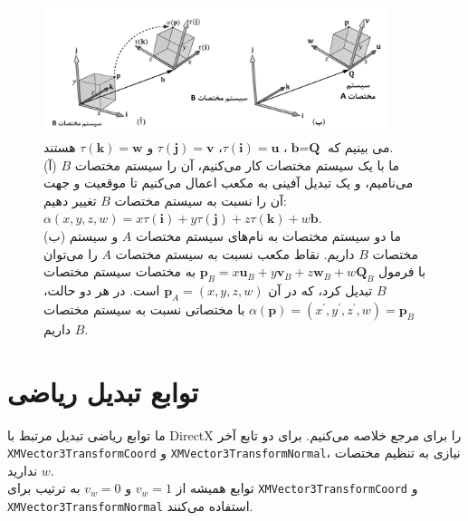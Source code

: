 {\begin{spacing}{1.5}
        \begin{figure}[H]
            \centering
            \setlength{\belowcaptionskip}{-10pt}
            \includegraphics[width=0.9\textwidth]{Images/4/3/4.Session.1.3.15}
            \caption {می بینیم که $\textbf{b}=\textbf{Q}$، $\tau(\textbf{i})=\textbf{u}$، $\tau(\textbf{j})=\textbf{v}$ و $\tau(\textbf{k})=\textbf{w}$ هستند.
            \\(آ) ما با یک سیستم مختصات کار می‌کنیم، آن را سیستم مختصات $B$ می‌نامیم، و یک تبدیل آفینی به مکعب اعمال می‌کنیم
            تا موقعیت و جهت آن را نسبت به سیستم مختصات $B$ تغییر دهیم: $\alpha(x,y,z,w)=x\tau(\textbf{i})+y\tau(\textbf{j})+z\tau(\textbf{k})+w\textbf{b}$.
            \\(ب) ما دو سیستم مختصات به نام‌های سیستم مختصات $A$ و سیستم مختصات $B$ داریم.
            نقاط مکعب نسبت به سیستم مختصات $A$ را می‌توان با فرمول $\textbf{p}_{B}=x\textbf{u}_{B}+y\textbf{v}_{B}+z\textbf{w}_{B}+w\textbf{Q}_{B}$ به مختصات سیستم مختصات $B$ تبدیل کرد، که در آن $\textbf{p}_{A}=(x,y,z,w)$ است.
            در هر دو حالت، $\alpha(\textbf{p})=(x^\prime,y^\prime,z^\prime,w)=\textbf{p}_{B}$ با مختصاتی نسبت به سیستم مختصات $B$ داریم.}
            \label{fig:4.Session.1.3.15}
        \end{figure}
    \end{spacing}
}


\section{\textbf{توابع تبدیل ریاضی }}
\label{sec:3.6}
{
    \Large
    \begin{spacing}{1.5}
        ما توابع ریاضی تبدیل مرتبط با DirectX را برای مرجع خلاصه می‌کنیم.
        \textbf{\vspace{6pt}}
        \lr{}
        \textbf{\vspace{6pt}}
        برای دو تابع آخر \texttt{XMVector3TransformCoord} و \texttt{XMVector3TransformNormal}، نیازی به تنظیم مختصات $w$ ندارید.\\
        توابع همیشه از $v_{w}=1$ و $v_{w}=0$ به ترتیب برای \texttt{XMVector3TransformCoord} و \texttt{XMVector3TransformNormal} استفاده می‌کنند.
    \end{spacing}
}
\newpage


